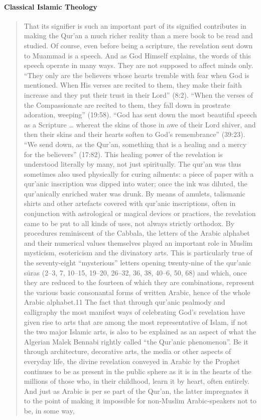 \paragraph{Classical Islamic Theology} \cite{winter_cambridge_2008}
\begin{quote} 
    That its signifier is such an important part of its signified contributes in making the Qur’an a much richer reality than a mere book to be read and studied. Of course, even before being a scripture, the revelation sent down to Muammad is a speech. And as God Himself explains, the words of this speech operate in many ways. They are not supposed to affect minds only. “They only are the believers whose hearts tremble with fear when God is mentioned. When His verses are recited to them, they make their faith increase and they put their trust in their Lord” (8:2). “When the verses of the Compassionate are recited to them, they fall down in prostrate adoration, weeping” (19:58). “God has sent down the most beautiful speech as a Scripture … whereat the skins of those in awe of their Lord shiver, and then their skins and their hearts soften to God’s remembrance” (39:23). “We send down, as the Qur’an, something that is a healing and a mercy for the believers” (17:82). This healing power of the revelation is understood literally by many, not just spiritually. The qur’an was thus sometimes also used physically for curing ailments: a piece of paper with a qur’anic inscription was dipped into water; once the ink was diluted, the qur’anically enriched water was drunk. By means of amulets, talismanic shirts and other artefacts covered with qur’anic inscriptions, often in conjunction with astrological or magical devices or practices, the revelation came to be put to all kinds of uses, not always strictly orthodox. By procedures reminiscent of the Cabbala, the letters of the Arabic alphabet and their numerical values themselves played an important role in Muslim mysticism, esotericism and the divinatory arts. This is particularly true of the seventy-eight “mysterious” letters opening twenty-nine of the qur’anic sūras (2–3, 7, 10–15, 19–20, 26–32, 36, 38, 40–6, 50, 68) and which, once they are reduced to the fourteen of which they are combinations, represent the various basic consonantal forms of written Arabic, hence of the whole Arabic alphabet.11 The fact that through qur’anic psalmody and calligraphy the most manifest ways of celebrating God’s revelation have given rise to arts that are among the most representative of Islam, if not the two major Islamic arts, is also to be explained as an aspect of what the Algerian Malek Bennabi rightly called “the Qur’anic phenomenon”. Be it through architecture, decorative arts, the media or other aspects of everyday life, the divine revelation conveyed in Arabic by the Prophet continues to be as present in the public sphere as it is in the hearts of the millions of those who, in their childhood, learn it by heart, often entirely. And just as Arabic is per se part of the Qur’an, the latter impregnates it to the point of making it impossible for non-Muslim Arabic-speakers not to be, in some way, 
\end{quote}
